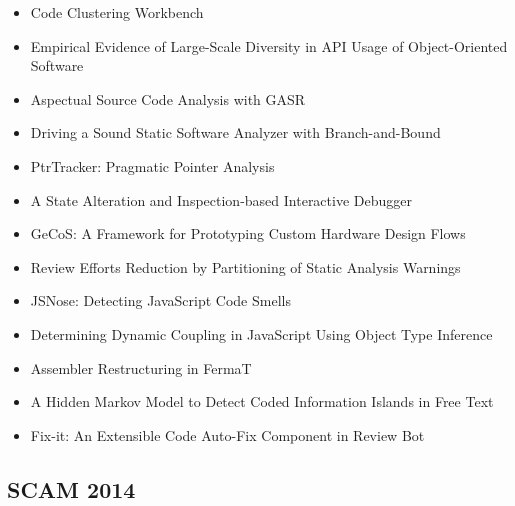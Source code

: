 {\small
\begin{itemize}[itemsep=-1ex]
  \item Code Clustering Workbench
  \item Empirical Evidence of Large-Scale Diversity in API Usage of Object-Oriented Software
  \item Aspectual Source Code Analysis with GASR
  \item Driving a Sound Static Software Analyzer with Branch-and-Bound
  \item PtrTracker: Pragmatic Pointer Analysis
  \item A State Alteration and Inspection-based Interactive Debugger
  \item GeCoS: A Framework for Prototyping Custom Hardware Design Flows
  \item Review Efforts Reduction by Partitioning of Static Analysis Warnings
  \item JSNose: Detecting JavaScript Code Smells
  \item Determining Dynamic Coupling in JavaScript Using Object Type Inference
  \item Assembler Restructuring in FermaT
  \item A Hidden Markov Model to Detect Coded Information Islands in Free Text
  \item Fix-it: An Extensible Code Auto-Fix Component in Review Bot
\end{itemize}
}

\subsection{SCAM 2014}

